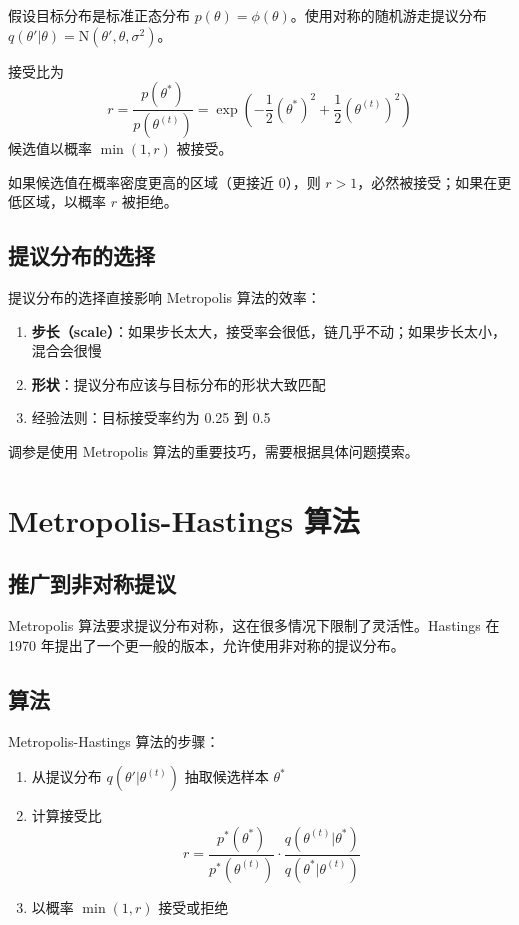 \begin{Example}[一维高斯目标分布]
  假设目标分布是标准正态分布 $p(\theta) = \phi(\theta)$。使用对称的随机游走提议分布 $q(\theta' | \theta) = \mathrm{N}(\theta', \theta, \sigma^2)$。

  接受比为
  \begin{equation}\label{eq:gaussian-acceptance-ratio}
  r = \frac{p(\theta^*)}{p(\theta^{(t)})} = \exp\!\left(-\frac{1}{2}(\theta^*)^2 + \frac{1}{2}(\theta^{(t)})^2\right)
  \end{equation}
  候选值以概率 $\min(1, r)$ 被接受。

  如果候选值在概率密度更高的区域（更接近 0），则 $r > 1$，必然被接受；如果在更低区域，以概率 $r$ 被拒绝。
\end{Example}

\subsection{提议分布的选择}

提议分布的选择直接影响 Metropolis 算法的效率：

\begin{enumerate}
  \item \textbf{步长（scale）}：如果步长太大，接受率会很低，链几乎不动；如果步长太小，混合会很慢
  \item \textbf{形状}：提议分布应该与目标分布的形状大致匹配
  \item 经验法则：目标接受率约为 0.25 到 0.5
\end{enumerate}

调参是使用 Metropolis 算法的重要技巧，需要根据具体问题摸索。

\section{Metropolis-Hastings 算法}

\subsection{推广到非对称提议}

Metropolis 算法要求提议分布对称，这在很多情况下限制了灵活性。Hastings 在 1970 年提出了一个更一般的版本，允许使用非对称的提议分布。

\subsection{算法}

Metropolis-Hastings 算法的步骤：
\begin{enumerate}
  \item 从提议分布 $q(\theta' | \theta^{(t)})$ 抽取候选样本 $\theta^*$
  \item 计算接受比
    \begin{equation}\label{eq:mh-acceptance-ratio}
    r = \frac{p^*(\theta^*)}{p^*(\theta^{(t)})} \cdot \frac{q(\theta^{(t)} | \theta^*)}{q(\theta^* | \theta^{(t)})}
    \end{equation}
  \item 以概率 $\min(1, r)$ 接受或拒绝
\end{enumerate}

